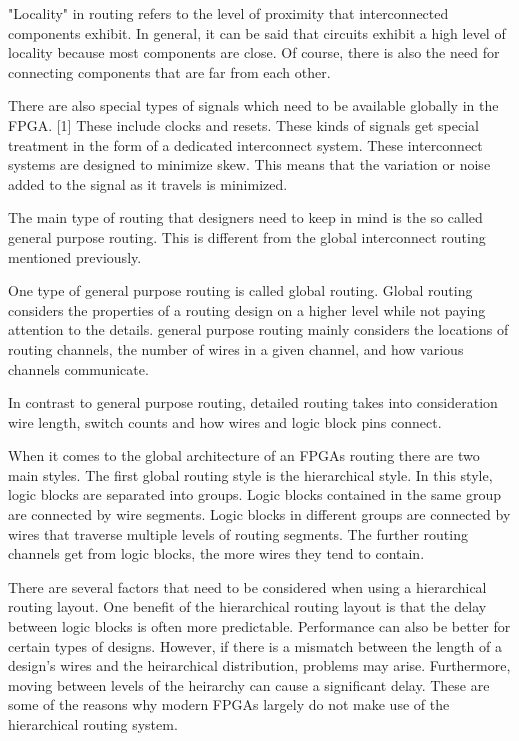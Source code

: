 \documentclass{article}
\begin{document}
    "Locality" in routing refers to the level of proximity that interconnected components
    exhibit. In general, it can be said that circuits exhibit a high level of locality
    because most components are close. Of course, there is also the need for connecting
    components that are far from each other.

    There are also special types of signals which need to be available globally
    in the FPGA. [1] These include clocks and resets. These kinds of signals get
    special treatment in the form of a dedicated interconnect system. These
    interconnect systems are designed to minimize skew. This means that the
    variation or noise added to the signal as it travels is minimized.

    The main type of routing that designers need to keep in mind is the so called
    general purpose routing. This is different from the global interconnect routing
    mentioned previously.
    
    One type of general purpose routing is called global routing. Global routing
    considers the properties of a routing design on a higher level while not paying attention
    to the details. general purpose routing mainly considers the locations of routing
    channels, the number of wires in a given channel, and how various channels communicate.

    In contrast to general purpose routing, detailed routing takes into consideration
    wire length, switch counts and how wires and logic block pins connect.

    When it comes to the global architecture of an FPGAs routing there are two main styles.
    The first global routing style is the hierarchical style. In this style,
    logic blocks are separated into groups. Logic blocks contained in the same group
    are connected by wire segments. Logic blocks in different groups are connected
    by wires that traverse multiple levels of routing segments.
    The further routing channels get from logic blocks, the more wires they tend to contain.

    There are several factors that need to be considered when using a hierarchical routing
    layout. One benefit of the hierarchical routing layout is that the delay
    between logic blocks is often more predictable. Performance can also be better for
    certain types of designs.
    However, if there is a mismatch between the length of a design's wires and the
    heirarchical distribution, problems may arise. Furthermore, moving between levels
    of the heirarchy can cause a significant delay. These are some of the reasons
    why modern FPGAs largely do not make use of the hierarchical routing system.
\end{document}
